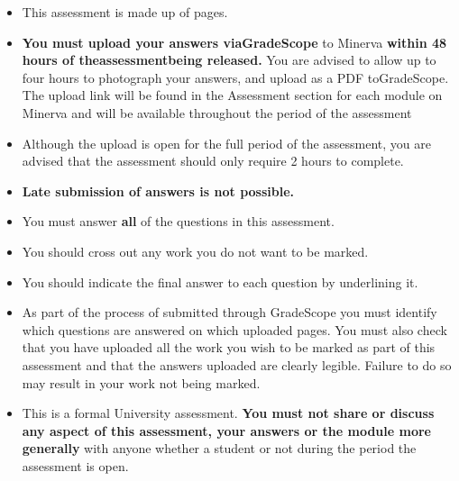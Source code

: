 \documentclass[12pt]{article}
\begin{document}
	\begin{itemize}
		\item This assessment is made up of \pageref{LastPage} pages.  
		\item \textbf{You must upload your answers viaGradeScope} to Minerva \textbf{within 48 hours of theassessmentbeing released.} You are advised to allow up to four hours to photograph your answers, and upload  as a PDF  toGradeScope. The upload link will be found in the Assessment section for each module on Minerva and will be available throughout the period of the assessment
		\item Although the upload is open for the full period of the assessment, you
		are advised that the assessment should only require 2 hours to complete.
		\item \textbf{Late submission of answers is not possible. }
		\item You must answer \textbf{all} of the questions in this assessment.
		\item You should cross out any work you do not want to be marked. 
		\item You should indicate the final answer to each question by underlining it. 
		\item As part of the process of submitted through GradeScope you must identify
		which questions are answered on which uploaded pages. You must also check
		that you have uploaded all the work you wish to be marked as part of this
		assessment and that the answers uploaded are clearly legible. Failure to do
		so may result in your work not being marked. 
		\item This is a formal University assessment. \textbf{You must not share or
			discuss any aspect of this assessment, your answers or the module more
			generally} with anyone whether a student or not during the period the
		assessment is open.
	\end{itemize}
	
\end{document}
